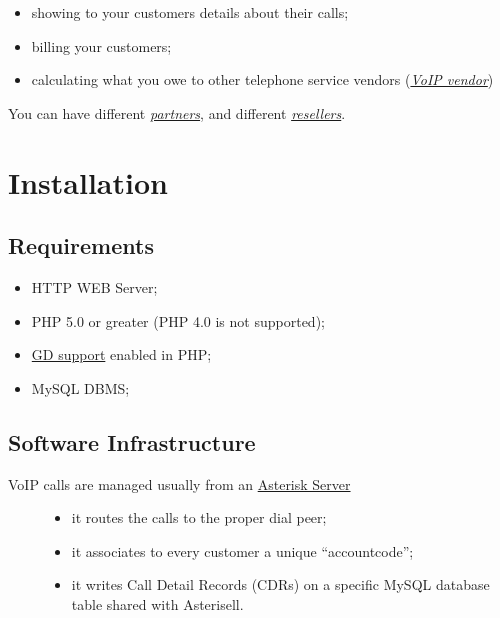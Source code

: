 \documentclass[letterpaper,10pt,english]{sphinxmanual}
\begin{document}
\begin{description}
\begin{itemize}
\item {} 
showing to your customers details about their calls;

\item {} 
billing your customers;

\item {} 
calculating what you owe to other telephone service vendors ({\hyperref[index:term-voip-vendor]{\emph{VoIP vendor}}})

\end{itemize}

\end{description}

You can have different {\hyperref[index:term-partner]{\emph{partners}}}, and different {\hyperref[index:term-reseller]{\emph{resellers}}}.


\chapter{Installation}
\label{index:installation}

\section{Requirements}
\label{index:requirements}\begin{itemize}
\item {} 
HTTP WEB Server;

\item {} 
PHP 5.0 or greater (PHP 4.0 is not supported);

\item {} 
\href{http://www.php.net/manual/en/image.installation.php}{GD support} enabled in PHP;

\item {} 
MySQL DBMS;

\end{itemize}


\section{Software Infrastructure}
\label{index:software-infrastructure}\begin{description}
\item[{VoIP calls are managed usually from an \href{http://www.asterisk.org}{Asterisk Server}}] \leavevmode\begin{itemize}
\item {} 
it routes the calls to the proper dial peer;

\item {} 
it associates to every customer a unique ``accountcode'';

\item {} 
it writes Call Detail Records (CDRs) on a specific MySQL database table shared with Asterisell.

\end{itemize}

\end{description}
\end{document}
